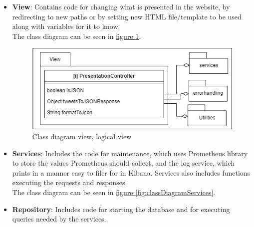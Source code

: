 \begin{itemize}
    \item \textbf{View}: Contains code for changing what is presented in the website, by redirecting to new paths or by setting new HTML file/template to be used along with variables for it to know.\\
    The class diagram can be seen in \hyperref[fig:classDiagramView]{figure \ref{fig:classDiagramView}}.
    \begin{figure}[H]
        \centering
        \includegraphics[width=1.0\textwidth]{images/class_diagram_view.jpg}
        \caption{Class diagram view, logical view}
        \label{fig:classDiagramView}
    \end{figure}
    
    \item \textbf{Services}: Includes the code for maintenance, which uses Prometheus library to store the values Prometheus should collect, and the log service, which prints in a manner easy to filer for in Kibana. Services also includes functions executing the requests and responses.\\
    The class diagram can be seen in \hyperref[fig:classDiagramServices]{figure \ref{fig:classDiagramServices}}.
    \item \textbf{Repository}: Includes code for starting the database and for executing queries needed by the services. 
    

\end{itemize}
